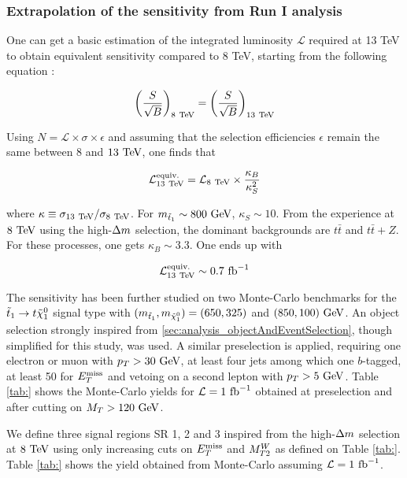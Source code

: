         \loremipsum

            \subsubsection{Extrapolation of the sensitivity from Run I analysis}

        One can get a basic estimation of the integrated luminosity $\mathcal{L}$ required 
        at 13 TeV to obtain equivalent sensitivity compared to 8 TeV, starting from the 
        following equation : 

        $$ \left( \frac{S}{\sqrt{B}} \right)_{8~\text{TeV}} = \left( \frac{S}{\sqrt{B}} \right)_{13~\text{TeV}}  $$

        Using $N = \mathcal{L} \times \sigma \times \epsilon$ and assuming that the selection
        efficiencies $\epsilon$ remain the same between $8$ and $13~\text{TeV}$, one finds that
        
        $$ \mathcal{L}^\text{equiv.}_{13~\text{TeV}} = \mathcal{L}_{8~\text{TeV}} \times \frac{\kappa_B}{\kappa^2_S} $$

        where $\kappa \equiv \sigma_{13~\text{TeV}} / \sigma_{8~\text{TeV}}$. For $m_{\tilde{t}_1} \sim 800~\text{GeV}$,
        $\kappa_S \sim 10$. From the experience at $8~\text{TeV}$ using the high-$\Delta m$ selection,
        the dominant backgrounds are $t\bar{t}$ and $t\bar{t}+Z$. For these processes, one
        gets $\kappa_B \sim 3.3$. One ends up with

        $$ \mathcal{L}^\text{equiv.}_{13~\text{TeV}} \sim 0.7~\text{fb}^{-1}$$

        The sensitivity has been further studied on two Monte-Carlo benchmarks for the 
        $\tilde{t}_1 \rightarrow t \tilde{\chi}_1^0$ signal type with $(m_{\tilde{t}_1},
        m_{\tilde{\chi}_1^0}) = (650,325)$ and $(850,100) ~\text{GeV}$. An object selection 
        strongly inspired from \ref{sec:analysis_objectAndEventSelection}, though simplified
        for this study, was used. A similar preselection is applied, requiring one electron
        or muon with $p_T > 30~\text{GeV}$, at least four jets among which one $b$-tagged, at least
        50 \GeV for $E_T^\text{miss}$ and vetoing on a second lepton with $p_T > 5~\text{GeV}$. Table \ref{tab:}
        shows the Monte-Carlo yields for $\mathcal{L} = 1~\text{fb}^{-1}$ obtained at preselection 
        and after cutting on $M_T > 120~\text{GeV}$.


        We define three signal regions SR 1, 2 and 3 inspired from the high-$\Delta m$
        selection at $8~\text{TeV}$ using only increasing cuts on $E_T^\text{miss}$ and $M_{T2}^W$ as defined
        on Table \ref{tab:}. Table \ref{tab:} shows the yield obtained from Monte-Carlo
        assuming $\mathcal{L} = 1~\text{fb}^{-1}$. 

